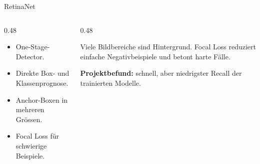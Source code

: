 \begin{frame}{RetinaNet}
\small
\begin{columns}[T,onlytextwidth]
\begin{column}{0.48\textwidth}
\begin{itemize}
    \item One-Stage-Detector.
    \item Direkte Box- und Klassenprognose.
    \item Anchor-Boxen in mehreren Grössen.
    \item Focal Loss für schwierige Beispiele.
\end{itemize}
\end{column}
\begin{column}{0.48\textwidth}
\begin{mynote}
\small
Viele Bildbereiche sind Hintergrund. Focal Loss reduziert einfache Negativbeispiele und betont harte Fälle.
\end{mynote}
\vspace{0.4em}
\scriptsize
\textbf{Projektbefund:} schnell, aber niedrigster Recall der trainierten Modelle.
\end{column}
\end{columns}
\end{frame}
